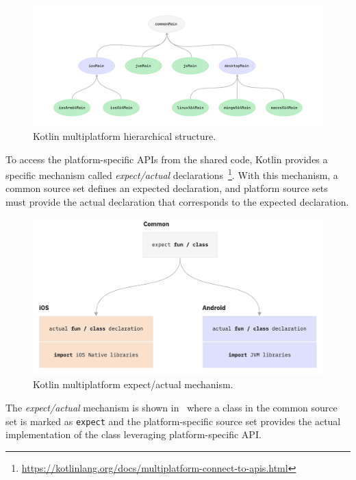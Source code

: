 \begin{figure}[ht]
	\centering
	\includegraphics[width=\linewidth]{figures/kotlin-multiplatform-hierarchical-structure.pdf}
	\caption{Kotlin multiplatform hierarchical structure.}
	\label{fig:kotlin-multiplatform-hierarchy}
\end{figure}

To access the platform-specific APIs from the shared code, Kotlin provides a specific mechanism called \emph{expect/actual}
declarations~\footnote{\url{https://kotlinlang.org/docs/multiplatform-connect-to-apis.html}}.
With this mechanism, a common source set defines an expected declaration, and platform source sets must provide the actual declaration that
corresponds to the expected declaration.

\begin{figure}
	\centering
	\includegraphics[width=\linewidth]{figures/expect-actual.png}
	\caption{Kotlin multiplatform expect/actual mechanism.}
	\label{fig:kotlin-multiplatform-expected-actual}
\end{figure}

The \emph{expect/actual} mechanism is shown in~ where a class in the common source set is marked as
\texttt{expect} and the platform-specific source set provides the actual implementation of the class leveraging platform-specific API.

